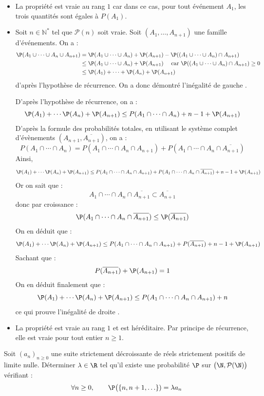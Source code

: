 \documentclass[a4paper,10pt]{report}
\begin{document}
\begin{itemize}
\item La propriété est vraie au rang $1$ car dans ce cas, pour tout événement $A_1$, les trois quantités sont égales à $P(A_1)$.
\item Soit $n \in \mathbb{N}^*$ tel que $\mathcal{P}(n)$ soit vraie. Soit $(A_1, \ldots, A_{n+1})$ une famille d'événements. On a :
\begin{align*}
\P(A_1 \cup \cdots \cup A_n \cup A_{n+1}) & = \P(A_1 \cup \cdots  \cup A_{n}) + \P(A_{n+1}) - \P((A_1 \cup \cdots \cup A_n) \cap A_{n+1}) \\
& \leq \P(A_1 \cup \cdots  \cup A_{n}) + \P(A_{n+1}) \quad \hbox{ car } \P((A_1 \cup \cdots \cup A_n) \cap A_{n+1}) \geq 0 \\
& \leq \P(A_1) + \cdots + \P(A_n) + \P(A_{n+1})
\end{align*}
d'après l'hypothèse de récurrence. On a donc démontré l'inégalité \og de gauche \fg.

\medskip

\noindent D'après l'hypothèse de récurrence, on a :
$$  \P(A_1) + \cdots \P(A_n) + \P(A_{n+1}) \leq P(A_1 \cap \cdots \cap A_n) + n-1  + \P(A_{n+1})$$
D'après la formule des probabilités totales, en utilisant le système complet d'évènements $(A_{n+1}, \overline{A_{n+1}})$, on a :
$$ P(A_1 \cap \cdots \cap A_n) = P(A_1 \cap \cdots \cap A_n \cap A_{n+1}) + P(A_1 \cap \cdots \cap A_n \cap \overline{A_{n+1}})$$
Ainsi,
$$ \P(A_1) + \cdots \P(A_n) + \P(A_{n+1}) \leq P(A_1 \cap \cdots \cap A_n \cap A_{n+1}) + P(A_1 \cap \cdots \cap A_n \cap \overline{A_{n+1}}) + n-1  + \P(A_{n+1})$$
Or on sait que :
$$ A_1 \cap \cdots \cap A_n \cap \overline{A_{n+1}} \subset \overline{A_{n+1}}$$
donc par croissance :
$$ \P(A_1 \cap \cdots \cap A_n \cap \overline{A_{n+1}}) \leq \P(\overline{A_{n+1}})$$
On en déduit que : 
$$ \P(A_1) + \cdots \P(A_n) + \P(A_{n+1}) \leq P(A_1 \cap \cdots \cap A_n \cap A_{n+1}) + P(\overline{A_{n+1}}) + n-1  + \P(A_{n+1})$$
Sachant que :
$$ P(\overline{A_{n+1}}) + \P(A_{n+1})=1$$
On en déduit finalement que :
$$  \P(A_1) + \cdots \P(A_n) + \P(A_{n+1}) \leq P(A_1 \cap \cdots \cap A_n \cap A_{n+1}) +n $$
ce qui prouve l'inégalité \og de droite \fg.
\item La propriété est vraie au rang $1$ et est héréditaire. Par principe de récurrence, elle est vraie pour tout entier $n \geq 1$.
\end{itemize}


\begin{Exa} Soit $(a_n)_{n \geq 0}$ une suite strictement décroissante de réels strictement positifs de limite nulle.  Déterminer $\lambda \in \R$ tel qu'il existe une probabilité $\P$ sur $\bigl(\N,\mathcal{P}(\N)\bigr)$ vérifiant :
    \[
    \forall n \geq 0, \qquad \P\bigl( \lbrace n, n+1, \ldots \rbrace) = \lambda a_n
    \]
\end{Exa} 
\end{document}
